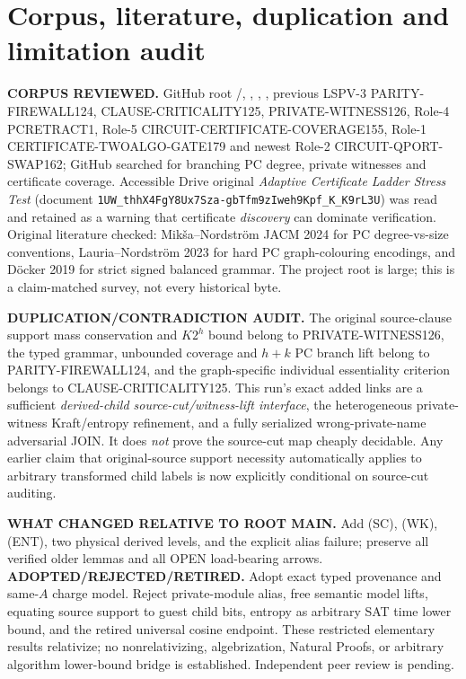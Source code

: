 \documentclass[11pt]{article}
\begin{document}
\section{Corpus, literature, duplication and limitation audit}
\textbf{CORPUS REVIEWED.}
GitHub root /,
, ,
, previous
LSPV-3 PARITY-FIREWALL124, CLAUSE-CRITICALITY125,
PRIVATE-WITNESS126, Role-4 PCRETRACT1,
Role-5 CIRCUIT-CERTIFICATE-COVERAGE155, Role-1
CERTIFICATE-TWOALGO-GATE179 and newest Role-2
CIRCUIT-QPORT-SWAP162; GitHub searched for branching
PC degree, private witnesses and certificate coverage.
Accessible Drive original \emph{Adaptive Certificate Ladder
Stress Test} (document
\texttt{1UW\_thhX4FgY8Ux7Sza-gbTfm9zIweh9Kpf\_K\_K9rL3U})
was read and retained as a warning that certificate
\emph{discovery} can dominate verification.
Original literature checked: Mik\v{s}a--Nordstr\"om
JACM 2024 for PC degree-vs-size conventions, Lauria--Nordstr\"om
2023 for hard PC graph-colouring encodings, and
D\"ocker 2019 for strict signed balanced grammar.
The project root is large; this is a claim-matched survey,
not every historical byte.

\textbf{DUPLICATION/CONTRADICTION AUDIT.}
The original source-clause support mass conservation and
$K2^h$ bound belong to PRIVATE-WITNESS126, the typed grammar,
unbounded coverage and $h+k$ PC branch lift belong to
PARITY-FIREWALL124, and the graph-specific individual
essentiality criterion belongs to CLAUSE-CRITICALITY125.
This run's exact added links are a sufficient \emph{derived-child
source-cut/witness-lift interface}, the heterogeneous
private-witness Kraft/entropy refinement, and a fully serialized
wrong-private-name adversarial JOIN. It does \emph{not}
prove the source-cut map cheaply decidable. Any earlier claim
that original-source support necessity automatically applies
to arbitrary transformed child labels is now explicitly
conditional on source-cut auditing.

\textbf{WHAT CHANGED RELATIVE TO ROOT MAIN.}
Add (SC), (WK), (ENT), two physical derived levels,
and the explicit alias failure; preserve all verified
older lemmas and all OPEN load-bearing arrows.
\textbf{ADOPTED/REJECTED/RETIRED.}
Adopt exact typed provenance and same-$A$ charge model.
Reject private-module alias, free semantic model lifts,
equating source support to guest child bits,
entropy as arbitrary SAT time lower bound, and the
retired universal cosine endpoint. These restricted
elementary results relativize; no nonrelativizing,
algebrization, Natural Proofs, or arbitrary algorithm
lower-bound bridge is established. Independent peer review
is pending.
\end{document}
